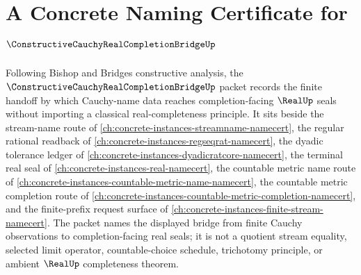 \chapter{A Concrete Naming Certificate for $\ConstructiveCauchyRealCompletionBridgeUp$}
\label{ch:concrete-instances-constructive-cauchy-real-completion-bridge-namecert}

Following Bishop and Bridges constructive analysis, the $\ConstructiveCauchyRealCompletionBridgeUp$ packet records the finite handoff by which Cauchy-name data reaches completion-facing $\RealUp$ seals without importing a classical real-completeness principle. It sits beside the stream-name route of \autoref{ch:concrete-instances-streamname-namecert}, the regular rational readback of \autoref{ch:concrete-instances-regseqrat-namecert}, the dyadic tolerance ledger of \autoref{ch:concrete-instances-dyadicratcore-namecert}, the terminal real seal of \autoref{ch:concrete-instances-real-namecert}, the countable metric name route of \autoref{ch:concrete-instances-countable-metric-name-namecert}, the countable metric completion route of \autoref{ch:concrete-instances-countable-metric-completion-namecert}, and the finite-prefix request surface of \autoref{ch:concrete-instances-finite-stream-namecert}. The packet names the displayed bridge from finite Cauchy observations to completion-facing real seals; it is not a quotient stream equality, selected limit operator, countable-choice schedule, trichotomy principle, or ambient $\RealUp$ completeness theorem.

